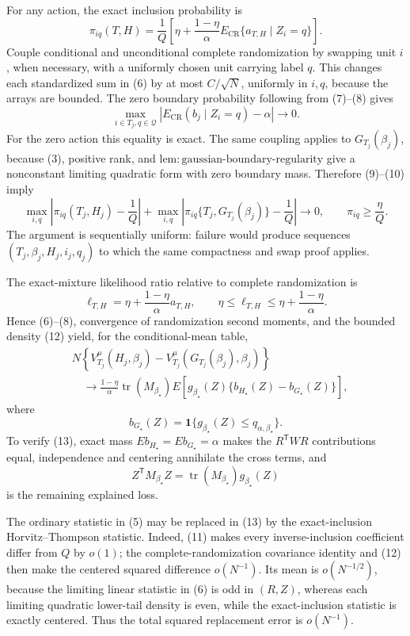 For any action, the exact inclusion probability is
\[
\pi_{iq}(T,H)
=\frac1Q\left[
\eta+\frac{1-\eta}{\alpha}
E_{\mathrm{CR}}\{a_{T,H}\mid Z_i=q\}
\right].
\tag{9}
\]
Couple conditional and unconditional complete randomization by swapping unit \(i\), when necessary, with a uniformly chosen unit carrying label \(q\).  This changes each standardized sum in (6) by at most \(C/\sqrt N\), uniformly in \(i,q\), because the arrays are bounded.  The zero boundary probability following from (7)--(8) gives
\[
\max_{i\in T_j,q\in\mathcal Q}
\left|E_{\mathrm{CR}}(b_j\mid Z_i=q)-\alpha\right|
\longrightarrow0.
\tag{10}
\]
For the zero action this equality is exact.  The same coupling applies to \(G_{T_j}(\beta_j)\), because (3), positive rank, and \(\mathrm{lem{:}gaussian\text{-}boundary\text{-}regularity}\) give a nonconstant limiting quadratic form with zero boundary mass.  Therefore (9)--(10) imply
\[
\max_{i,q}\left|
\pi_{iq}(T_j,H_j)-\frac1Q\right|
+\max_{i,q}\left|
\pi_{iq}\{T_j,G_{T_j}(\beta_j)\}-\frac1Q\right|
\longrightarrow0,
\qquad
\pi_{iq}\geq\frac\eta Q.
\tag{11}
\]
The argument is sequentially uniform: failure would produce sequences \((T_j,\beta_j,H_j,i_j,q_j)\) to which the same compactness and swap proof applies.

The exact-mixture likelihood ratio relative to complete randomization is
\[
\ell_{T,H}=\eta+\frac{1-\eta}{\alpha}a_{T,H},
\qquad
\eta\leq\ell_{T,H}\leq\eta+\frac{1-\eta}{\alpha}.
\tag{12}
\]
Hence (6)--(8), convergence of randomization second moments, and the bounded density (12) yield, for the conditional-mean table,
\[
\begin{aligned}
&N\left\{
V_{T_j}^{\mu}(H_j,\beta_j)
-V_{T_j}^{\mu}(G_{T_j}(\beta_j),\beta_j)
\right\}\\
&\quad\longrightarrow
\frac{1-\eta}{\alpha}\operatorname{tr}(M_{\beta_\star})
E\!\left[
g_{\beta_\star}(Z)
\{b_{H_\star}(Z)-b_{G_\star}(Z)\}
\right],
\end{aligned}
\tag{13}
\]
where
\[
b_{G_\star}(Z)
=\mathbf 1\{g_{\beta_\star}(Z)
\leq q_{\alpha,\beta_\star}\}.
\tag{14}
\]
To verify (13), exact mass \(E b_{H_\star}=E b_{G_\star}=\alpha\) makes the \(R^{\mathsf T}WR\) contributions equal, independence and centering annihilate the cross terms, and
\[
Z^{\mathsf T}M_{\beta_\star}Z
=\operatorname{tr}(M_{\beta_\star})g_{\beta_\star}(Z)
\tag{15}
\]
is the remaining explained loss.

The ordinary statistic in (5) may be replaced in (13) by the exact-inclusion Horvitz--Thompson statistic.  Indeed, (11) makes every inverse-inclusion coefficient differ from \(Q\) by \(o(1)\); the complete-randomization covariance identity and (12) then make the centered squared difference \(o(N^{-1})\).  Its mean is \(o(N^{-1/2})\), because the limiting linear statistic in (6) is odd in \((R,Z)\), whereas each limiting quadratic lower-tail density is even, while the exact-inclusion statistic is exactly centered.  Thus the total squared replacement error is \(o(N^{-1})\).

